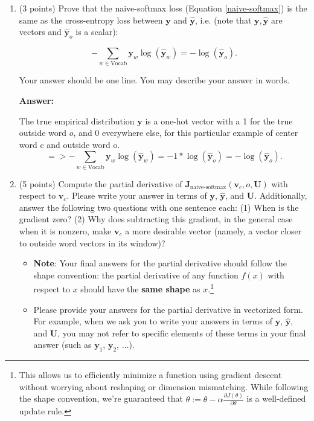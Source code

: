 \documentclass{article}
\newenvironment{answer}{
    {\bf Answer:} \sf \begingroup\color{red}
}{\endgroup}%
\begin{document}
\clearpage 
\begin{enumerate}[label=(\alph*)]
\item (3 points) 
Prove that the naive-softmax loss (Equation \ref{naive-softmax}) is the same as the cross-entropy loss between $\bm y$ and $\hat{\bm y}$, i.e. (note that $\bm y, \hat{\bm y}$ are vectors and $\hat{\bm y}_o$ is a scalar):

\begin{equation} 
-\sum_{w \in \text{Vocab}} \bm y_w \log(\hat{\bm y}_w) = - \log (\hat{\bm y}_o).
\end{equation}

Your answer should be one line. You may describe your answer in words.
\begin{shaded}
\begin{answer}
The true empirical distribution $\bm y$ is a one-hot vector with a 1 for the true outside word $o$, and 0 everywhere else, for this particular example of center word c and outside word o. \
\begin{equation} 
=> -\sum_{w \in \text{Vocab}} \bm y_w \log(\hat{\bm y}_w) = - 1*\log (\hat{\bm y}_o) = - \log (\hat{\bm y}_o).
\end{equation}
\end{answer}
\end{shaded}

\item (5 points) Compute the partial derivative of $\bm J_{\text{naive-softmax}}(\bm v_c, o, \bm U)$ with respect to $\bm v_c$. Please write your answer in terms of $\bm y$, $\hat{\bm y}$, and $\bm U$. Additionally, answer the following two questions with one sentence each: (1) When is the gradient zero? (2) Why does subtracting this gradient, in the general case when it is nonzero, make $\bm v_c$ a more desirable vector (namely, a vector closer to outside word vectors in its window)?

\begin{itemize} 
\item \textbf{Note}: Your final answers for the partial derivative should follow the shape convention: the partial derivative of any function $f(x)$ with respect to $x$ should have the \textbf{same shape} as $x$.\footnote{This allows us to efficiently minimize a function using gradient descent without worrying about reshaping or dimension mismatching. While following the shape convention, we're guaranteed that $\theta:= \theta - \alpha\frac{\partial J(\theta)}{\partial \theta}$ is a well-defined update rule.}
\item Please provide your answers for the partial derivative in vectorized form. For example, when we ask you to write your answers in terms of $\bm y$, $\hat{\bm y}$, and $\bm U$, you may not refer to specific elements of these terms in your final answer (such as $\bm y_1$, $\bm y_2$, $\dots$). 
\end{itemize}




\end{enumerate}
\end{document}
